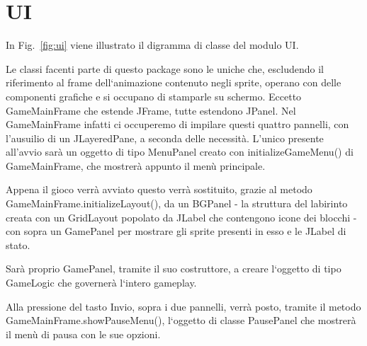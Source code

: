 \documentclass[12pt,a4paper]{report}
\begin{document}

\section{UI}\label{se:arch.ui}
In Fig.~\ref{fig:ui} viene illustrato il digramma di classe del modulo UI.\newline

Le classi facenti parte di questo package sono le uniche che, escludendo il riferimento al frame dell`animazione contenuto negli sprite, operano con delle componenti grafiche e si occupano di stamparle su schermo. Eccetto GameMainFrame che estende JFrame, tutte estendono JPanel. Nel GameMainFrame infatti ci occuperemo di impilare questi quattro pannelli, con l’ausuilio di un JLayeredPane, a seconda delle necessità. L’unico presente all’avvio sarà un oggetto di tipo MenuPanel creato con initializeGameMenu() di GameMainFrame, che mostrerà appunto il menù principale.

Appena il gioco verrà avviato questo verrà sostituito, grazie al metodo GameMainFrame.initializeLayout(), da un BGPanel - la struttura del labirinto creata con un GridLayout popolato da JLabel che contengono icone dei blocchi - con sopra un GamePanel per mostrare gli sprite presenti in esso e le JLabel di stato.

Sarà proprio GamePanel, tramite il suo costruttore, a creare l`oggetto di tipo GameLogic che governerà l`intero gameplay.

Alla pressione del tasto Invio, sopra i due pannelli, verrà posto, tramite il metodo GameMainFrame.showPauseMenu(), l`oggetto di classe PausePanel che mostrerà il menù di pausa con le sue opzioni.
\end{document}
